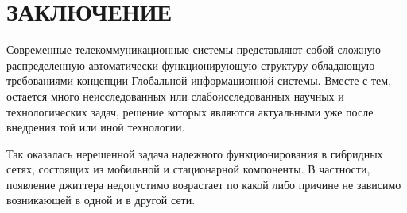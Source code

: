 \chapter*{ЗАКЛЮЧЕНИЕ}
Современные телекоммуникационные системы представляют собой сложную распределенную автоматически функционирующую структуру обладающую требованиями концепции Глобальной информационной системы.
Вместе с тем, остается много неисследованных или слабоисследованных научных и технологических задач, решение которых являются актуальными уже после внедрения той или иной технологии.

Так оказалась нерешенной задача надежного функционирования в гибридных сетях, состоящих из мобильной и стационарной компоненты.
В частности, появление джиттера недопустимо возрастает по какой либо причине не зависимо возникающей в одной и в другой сети.

